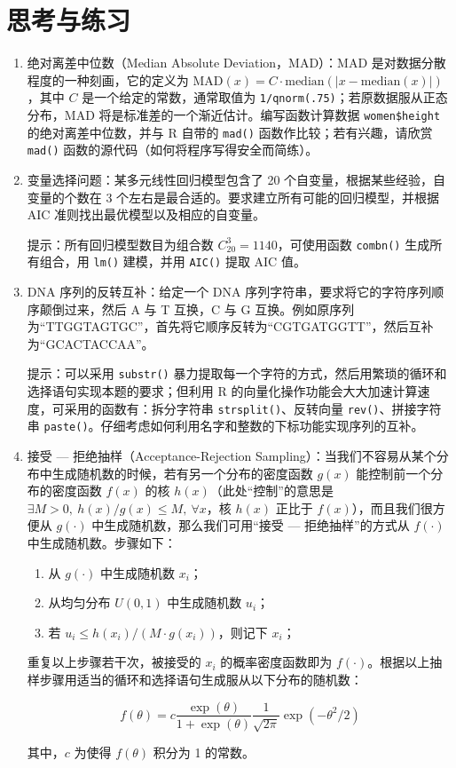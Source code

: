 \documentclass[
  b5paper,
  UTF8,twoside]{book}
\begin{document}
\section{思考与练习}\label{ux601dux8003ux4e0eux7ec3ux4e60-7}

\begin{enumerate}
\def\labelenumi{\arabic{enumi}.}
\item
  绝对离差中位数（Median Absolute Deviation，MAD）：MAD 是对数据分散程度的一种刻画，它的定义为 \(\text{MAD}(x)=C\cdot\text{median}(|x-\text{median}(x)|)\)，其中 \(C\) 是一个给定的常数，通常取值为 \texttt{1/qnorm(.75)}；若原数据服从正态分布，MAD 将是标准差的一个渐近估计。编写函数计算数据 \texttt{women\$height} 的绝对离差中位数，并与 R 自带的 \texttt{mad()} 函数作比较；若有兴趣，请欣赏 \texttt{mad()} 函数的源代码（如何将程序写得安全而简练）。
\item
  变量选择问题：某多元线性回归模型包含了 20 个自变量，根据某些经验，自变量的个数在 3 个左右是最合适的。要求建立所有可能的回归模型，并根据 AIC 准则找出最优模型以及相应的自变量。

  提示：所有回归模型数目为组合数 \(C_{20}^{3}=1140\)，可使用函数 \texttt{combn()} 生成所有组合，用 \texttt{lm()} 建模，并用 \texttt{AIC()} 提取 AIC 值。
\item
  DNA 序列的反转互补：给定一个 DNA 序列字符串，要求将它的字符序列顺序颠倒过来，然后 A 与 T 互换，C 与 G 互换。例如原序列为``TTGGTAGTGC''，首先将它顺序反转为``CGTGATGGTT''，然后互补为``GCACTACCAA''。

  提示：可以采用 \texttt{substr()} 暴力提取每一个字符的方式，然后用繁琐的循环和选择语句实现本题的要求；但利用 R 的向量化操作功能会大大加速计算速度，可采用的函数有：拆分字符串 \texttt{strsplit()}、反转向量 \texttt{rev()}、拼接字符串 \texttt{paste()}。仔细考虑如何利用名字和整数的下标功能实现序列的互补。
\item
  接受 --- 拒绝抽样（Acceptance-Rejection Sampling）：当我们不容易从某个分布中生成随机数的时候，若有另一个分布的密度函数 \(g(x)\) 能控制前一个分布的密度函数 \(f(x)\) 的核 \(h(x)\)（此处``控制''的意思是 \(\exists M>0,\ h(x)/g(x)\leq M,\ \forall x\)，核 \(h(x)\) 正比于 \(f(x)\)），而且我们很方便从 \(g(\cdot)\) 中生成随机数，那么我们可用``接受 --- 拒绝抽样''的方式从 \(f(\cdot)\) 中生成随机数。步骤如下：

  \begin{enumerate}
  \def\labelenumii{(\alph{enumii})}
  \item
    从 \(g(\cdot)\) 中生成随机数 \(x_{i}\)；
  \item
    从均匀分布 \(U(0,1)\) 中生成随机数 \(u_{i}\)；
  \item
    若 \(u_{i}\leq h(x_{i})/(M\cdot g(x_{i}))\)，则记下 \(x_{i}\)；
  \end{enumerate}

  重复以上步骤若干次，被接受的 \(x_{i}\) 的概率密度函数即为 \(f(\cdot)\)。根据以上抽样步骤用适当的循环和选择语句生成服从以下分布的随机数：

  \[f(\theta)=c\frac{\exp(\theta)}{1+\exp(\theta)}\frac{1}{\sqrt{2\pi}}\exp(-\theta^{2}/2)\]

  其中，\(c\) 为使得 \(f(\theta)\) 积分为 1 的常数。
\end{enumerate}
\end{document}

